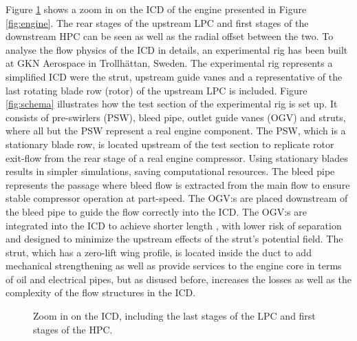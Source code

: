 Figure \ref{fig:enginezoom} shows a zoom in on the ICD of the engine presented in Figure \ref{fig:engine}. The rear stages of the upstream LPC and first stages of the downstream HPC can be seen as well as the radial offset between the two. To analyse the flow physics of the ICD in details, an experimental rig has been built at GKN Aerospace in Trollh\"{a}ttan, Sweden. The experimental rig represents a simplified ICD were the strut, upstream guide vanes and a representative of the last rotating blade row (rotor) of the upstream LPC is included. Figure \ref{fig:schema} illustrates how the test section of the experimental rig is set up. It consists of pre-swirlers (PSW), bleed pipe, outlet guide vanes (OGV) and struts, where all but the PSW represent a real engine component. The PSW, which is a stationary blade row, is located upstream of the test section to replicate rotor exit-flow from the rear stage of a real engine compressor. Using stationary blades results in simpler simulations, saving computational resources. The bleed pipe represents the passage where bleed flow is extracted from the main flow to ensure stable compressor operation at part-speed. The OGV:s are placed downstream of the bleed pipe to guide the flow correctly into the ICD. The OGV:s are integrated into the ICD to achieve shorter length \cite{Walker2011}, with lower risk of separation and designed to minimize the upstream effects of the strut's potential field. The strut, which has a zero-lift wing profile, is located inside the duct to add mechanical strengthening as well as provide services to the engine core in terms of oil and electrical pipes, but as disused before, increases the losses as well as the complexity of the flow structures in the ICD.
\begin{figure}[H]
  \centering
\caption{Zoom in on the ICD, including the last stages of the LPC and first stages of the HPC.} \label{fig:enginezoom}
\end{figure}

